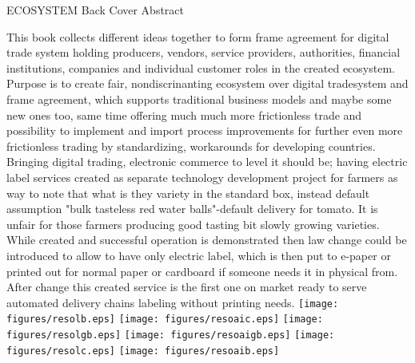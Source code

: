 %
%
%
ECOSYSTEM Back Cover Abstract\hfill
\label{abstract}
\linebreak

This book collects different ideas together to form frame agreement for digital
trade system holding producers, vendors, service providers, authorities,
financial institutions, companies and individual customer roles in the created
ecosystem. Purpose is to create fair, nondiscrinanting ecosystem over digital
tradesystem and frame agreement, which supports traditional business models and
maybe some new ones too, same time offering much much more frictionless trade
and possibility to implement and import process improvements for further even
more frictionless trading by standardizing, workarounds for developing
countries. Bringing digital trading, electronic commerce to level it should be;
having electric label services created as separate technology development
project for farmers as way to note that what is they variety in the standard
box, instead default assumption "bulk tasteless red water balls"-default
delivery for tomato. It is unfair for those farmers producing good tasting bit
slowly growing varieties. While created and successful operation is
demonstrated then law change could be introduced to allow to have only electric
label, which is then put to e-paper or printed out for normal paper or
cardboard if someone needs it in physical from. After change this created
service is the first one on market ready to serve automated delivery chains
labeling without printing needs.
\linebreak \vfill
\texttt{[image: figures/resolb.eps]} \hfill
\texttt{[image: figures/resoaic.eps]} \hfill
\texttt{[image: figures/resolgb.eps]} \hfill
\texttt{[image: figures/resoaigb.eps]} \hfill
\texttt{[image: figures/resolc.eps]} \hfill
\texttt{[image: figures/resoaib.eps]}

